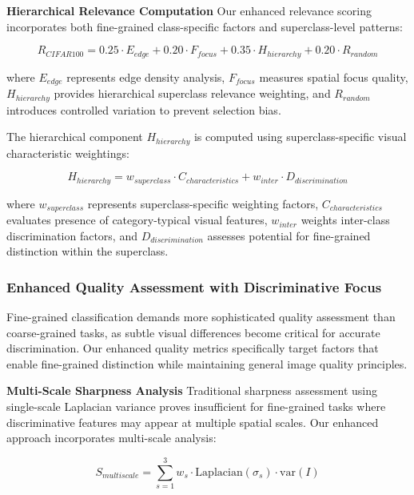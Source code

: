 \documentclass[12pt]{article}
\begin{document}
\textbf{Hierarchical Relevance Computation}
Our enhanced relevance scoring incorporates both fine-grained class-specific factors and superclass-level patterns:

\begin{equation}
R_{CIFAR100} = 0.25 \cdot E_{edge} + 0.20 \cdot F_{focus} + 0.35 \cdot H_{hierarchy} + 0.20 \cdot R_{random}
\end{equation}

where $E_{edge}$ represents edge density analysis, $F_{focus}$ measures spatial focus quality, $H_{hierarchy}$ provides hierarchical superclass relevance weighting, and $R_{random}$ introduces controlled variation to prevent selection bias.

The hierarchical component $H_{hierarchy}$ is computed using superclass-specific visual characteristic weightings:

\begin{equation}
H_{hierarchy} = w_{superclass} \cdot C_{characteristics} + w_{inter} \cdot D_{discrimination}
\end{equation}

where $w_{superclass}$ represents superclass-specific weighting factors, $C_{characteristics}$ evaluates presence of category-typical visual features, $w_{inter}$ weights inter-class discrimination factors, and $D_{discrimination}$ assesses potential for fine-grained distinction within the superclass.

\subsubsection{Enhanced Quality Assessment with Discriminative Focus}\label{enhanced-quality}

Fine-grained classification demands more sophisticated quality assessment than coarse-grained tasks, as subtle visual differences become critical for accurate discrimination. Our enhanced quality metrics specifically target factors that enable fine-grained distinction while maintaining general image quality principles.

\textbf{Multi-Scale Sharpness Analysis}
Traditional sharpness assessment using single-scale Laplacian variance proves insufficient for fine-grained tasks where discriminative features may appear at multiple spatial scales. Our enhanced approach incorporates multi-scale analysis:

\begin{equation}
S_{multiscale} = \sum_{s=1}^{3} w_s \cdot \text{Laplacian}(\sigma_s) \cdot \text{var}(I)
\end{equation}
\end{document}
